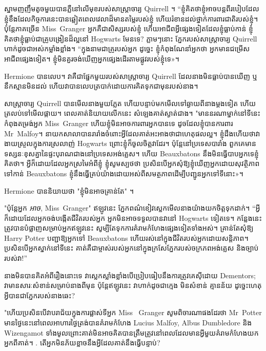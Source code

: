 {{ស្នាមញញឹមតូចមួយបានភ្លឺនៅលើមុខរបស់សាស្រ្តាចារ្យ Quirrell ។ “ខ្ញុំ​គិត​ថា​ខ្ញុំ​អាច​បន្ត​ពី​របៀប​ដែល​ខ្ញុំ​ខឹង​ដែល​កិច្ចការ​នេះ​បាន​ឆ្លៀត​ពេល​វេលា​ដ៏​មាន​តម្លៃ​របស់​ខ្ញុំ ហើយ​រំខាន​ដល់​ថ្នាក់​ការពារ​ជាតិ​របស់​ខ្ញុំ។ ប៉ុន្តែភាគច្រើន Miss~Granger អ្នកគឺជាសិស្សរបស់ខ្ញុំ ហើយអាជីពអ្វីផ្សេងទៀតដែលខ្ញុំធ្លាប់កាន់ ខ្ញុំគិតថាខ្ញុំធ្លាប់ជាគ្រូបង្រៀនដ៏ល្អនៅ Hogwarts មែនទេ? ភ្លាមៗនោះ ភ្នែករបស់សាស្រ្តាចារ្យ Quirrell ហាក់ដូចជាអស់កម្លាំងខ្លាំង។ “ក្នុងនាមជាគ្រូរបស់អ្នក ដូច្នេះ ខ្ញុំកំពុងណែនាំអ្នកថា អ្នកមានជម្រើសអាជីពផ្សេងទៀត។ ខ្ញុំ​មិន​គួរ​ចង់​ឃើញ​អ្នក​ផ្សេង​ដើរ​តាម​ផ្លូវ​របស់​ខ្ញុំ​ទេ»។

Hermione បានលេប។ វាគឺជាផ្នែកមួយរបស់សាស្រ្តាចារ្យ Quirrell ដែលនាងមិនធ្លាប់បានឃើញ ឬនឹកស្មានមិនដល់ ហើយវាបានលេបត្របាក់ដោយការគិតទុកជាមុនរបស់នាង។

សាស្រ្តាចារ្យ Quirrell បានមើលនាងមួយភ្លែត ហើយបន្ទាប់មកមើលទៅឆ្ងាយពីនាងម្តងទៀត ហើយត្រលប់ទៅមើលផ្កាយ។ ពេល​គាត់​និយាយ​លើក​នេះ សំឡេង​គាត់​ស្ងាត់​ជាង។ "មាននរណាម្នាក់នៅទីនេះកំពុងតម្រង់អ្នក Miss~Granger ហើយខ្ញុំមិនអាចការពារអ្នកបានទេ ដូចដែលខ្ញុំបានការពារ Mr~Malfoy។ នាយក​សាលា​បាន​រារាំង​ចំពោះ​អ្វី​ដែល​គាត់​អះអាង​ថា​ជា​ហេតុផល​ល្អ។ ខ្ញុំដឹងហើយថាវាងាយស្រួលក្នុងការស្រលាញ់ Hogwarts ព្រោះខ្ញុំក៏ចូលចិត្តវាដែរ។ ប៉ុន្តែ​នៅ​ប្រទេស​បារាំង ពួកគេ​មាន​ទស្សនៈ​ខុស​គ្នា​នៃ​ផ្ទះ​បុរាណ​ជាង​នៅ​ប្រទេស​អង់គ្លេស។ ហើយ Beauxbatons នឹងមិនធ្វើបាបអ្នកទេខ្ញុំគិតថា។ អ្វីក៏ដោយដែលអ្នកស្រមៃអំពីខ្ញុំ ខ្ញុំសូមស្បថថា ប្រសិនបើអ្នកសុំឱ្យខ្ញុំឃើញអ្នកដោយសុវត្ថិភាពទៅកាន់ Beauxbatons ខ្ញុំនឹងធ្វើគ្រប់យ៉ាងដោយអស់ពីសមត្ថភាពដើម្បីបញ្ជូនអ្នកទៅទីនោះ»។

Hermione បាននិយាយថា "ខ្ញុំមិនអាចគ្រាន់តែ" ។

"ប៉ុន្តែអ្នក \emph{អាច}, Miss~Granger" ឥឡូវនេះ ភ្នែកពណ៌ខៀវស្លេកមើលនាងយ៉ាងយកចិត្តទុកដាក់។ “អ្វីក៏ដោយដែលអ្នកចង់បង្កើតជីវិតរបស់អ្នក អ្នកមិនអាចទទួលបានវានៅ Hogwarts ទៀតទេ។ កន្លែងនេះត្រូវបានបំផ្លាញសម្រាប់អ្នកឥឡូវនេះ សូម្បីតែទុកការគំរាមកំហែងផ្សេងទៀតទាំងអស់។ គ្រាន់តែសុំឱ្យ Harry Potter បញ្ជាឱ្យអ្នកទៅ Beauxbatons ហើយរស់នៅក្នុងជីវិតរបស់អ្នកដោយសន្តិភាព។ ប្រសិនបើអ្នកស្នាក់នៅទីនេះ គាត់គឺជាម្ចាស់របស់អ្នកនៅក្នុងក្រសែភ្នែករបស់ចក្រភពអង់គ្លេស និងច្បាប់របស់វា!”

នាង​មិន​បាន​គិត​អំពី​រឿង​នោះ​ទេ វា​ស្លេក​ស្លាំង​ខ្លាំង​បើ​ប្រៀប​ធៀប​នឹង​ការ​ត្រូវ​គេ​ស៊ី​ដោយ Dementors; វាមានសារៈសំខាន់សម្រាប់នាងពីមុន ប៉ុន្តែឥឡូវនេះ វាហាក់ដូចជាក្មេង មិនសំខាន់ គ្មានន័យ ដូច្នេះហេតុអ្វីបានជាភ្នែករបស់នាងឆេះ?

"ហើយប្រសិនបើវាបរាជ័យក្នុងការផ្លាស់ទីអ្នក Miss ~Granger សូមពិចារណាផងដែរថា Mr~Potter មានថ្ងៃនេះនៅពេលអាហារថ្ងៃត្រង់បានគំរាមកំហែង Lucius Malfoy, Albus Dumbledore និង Wizengamot ទាំងមូលព្រោះគាត់មិនអាចគិតបានត្រឹមត្រូវនៅពេលដែលមានអ្វីមួយគំរាមកំហែងយកអ្នកពីគាត់។ . តើ​អ្នក​មិន​ភ័យ​ខ្លាច​នឹង​អ្វី​ដែល​គាត់​នឹង​ធ្វើ​បន្ទាប់​?

}}
